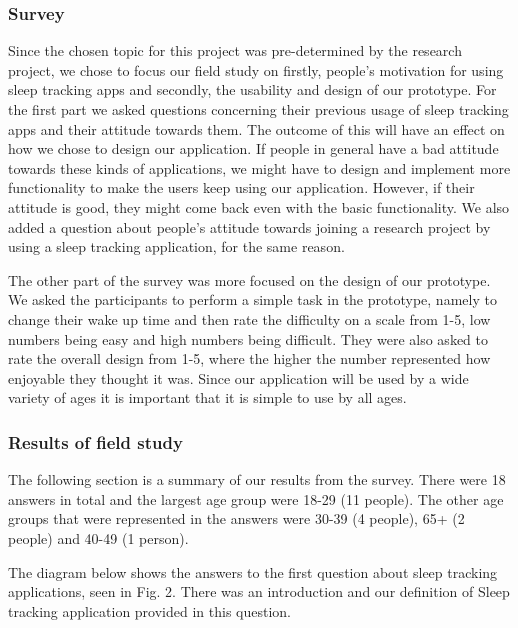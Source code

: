 \documentclass{article}
\begin{document}
\subsubsection{Survey}

Since the chosen topic for this project was pre-determined by the research project, we chose to focus our field study on firstly, people’s motivation for using sleep tracking apps and secondly, the usability and design of our prototype. For the first part we asked questions concerning their previous usage of sleep tracking apps and their attitude towards them. The outcome of this will have an effect on how we chose to design our application. If people in general have a bad attitude towards these kinds of applications, we might have to design and implement more functionality to make the users keep using our application. However, if their attitude is good, they might come back even with the basic functionality. We also added a question about people’s attitude towards joining a research project by using a sleep tracking application, for the same reason. 

The other part of the survey was more focused on the design of our prototype. We asked the participants to perform a simple task in the prototype, namely to change their wake up time and then rate the difficulty on a scale from 1-5, low numbers being easy and high numbers being difficult. They were also asked to rate the overall design from 1-5, where the higher the number represented how enjoyable they thought it was. Since our application will be used by a wide variety of ages it is important that it is simple to use by all ages. 

\subsubsection{Results of field study}
The following section is a summary of our results from the survey. There were 18 answers in total and the largest age group were 18-29 (11 people). The other age groups that were represented in the answers were 30-39 (4 people), 65+ (2 people) and 40-49 (1 person). 

The diagram below shows the answers to the first question about sleep tracking applications, seen in Fig. 2. There was an introduction and our definition of Sleep tracking application provided in this question. 
\end{document}

